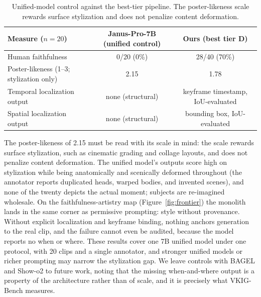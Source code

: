 \begin{table}[t]
\centering
\small
\begin{tabular}{lcc}
\toprule
Measure ($n=20$) & Janus-Pro-7B (unified control) & Ours (best tier D) \\
\midrule
Human faithfulness & 0/20 (0\%) & 28/40 (70\%) \\
Poster-likeness (1--3; stylization only) & 2.15 & 1.78 \\
Temporal localization output & none (structural) & keyframe timestamp, IoU-evaluated \\
Spatial localization output & none (structural) & bounding box, IoU-evaluated \\
\bottomrule
\end{tabular}
\caption{Unified-model control against the best-tier pipeline. The poster-likeness scale rewards surface stylization and does not penalize content deformation.}
\label{tab:unified}
\end{table}

The poster-likeness of 2.15 must be read with its scale in mind: the scale rewards surface stylization, such as cinematic grading and collage layouts, and does not penalize content deformation. The unified model's outputs score high on stylization while being anatomically and scenically deformed throughout (the annotator reports duplicated heads, warped bodies, and invented scenes), and none of the twenty depicts the actual moment; subjects are re-imagined wholesale. On the faithfulness-artistry map (Figure~\ref{fig:frontier}) the monolith lands in the same corner as permissive prompting: style without provenance. Without explicit localization and keyframe binding, nothing anchors generation to the real clip, and the failure cannot even be audited, because the model reports no when or where. These results cover one 7B unified model under one protocol, with 20 clips and a single annotator, and stronger unified models or richer prompting may narrow the stylization gap. We leave controls with BAGEL \citep{bagel2505} and Show-o2 \citep{showo22506} to future work, noting that the missing when-and-where output is a property of the architecture rather than of scale, and it is precisely what VKIG-Bench measures.
